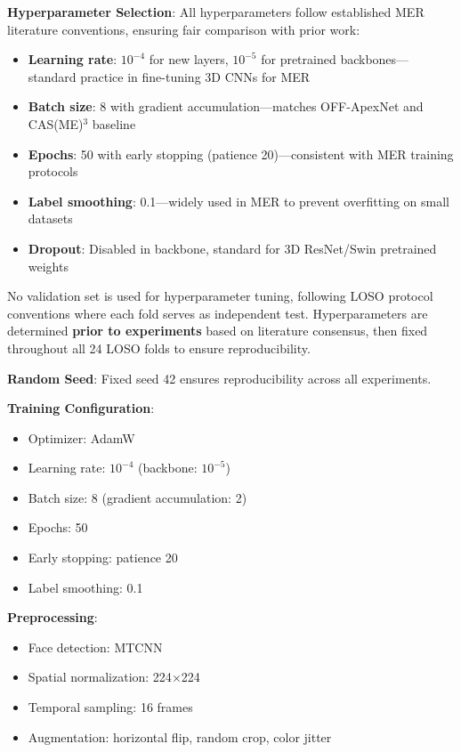 \documentclass[preprint,12pt,authoryear]{elsarticle}
\begin{document}
\textbf{Hyperparameter Selection}: All hyperparameters follow established MER literature conventions, ensuring fair comparison with prior work:

\begin{itemize}
\item \textbf{Learning rate}: $10^{-4}$ for new layers, $10^{-5}$ for pretrained backbones---standard practice in fine-tuning 3D CNNs for MER \cite{wang2022offapexnet,liu2022casme3}
\item \textbf{Batch size}: 8 with gradient accumulation---matches OFF-ApexNet \cite{wang2022offapexnet} and CAS(ME)$^3$ baseline \cite{liu2022casme3}
\item \textbf{Epochs}: 50 with early stopping (patience 20)---consistent with MER training protocols \cite{li2020casme2_protocol}
\item \textbf{Label smoothing}: 0.1---widely used in MER to prevent overfitting on small datasets \cite{wang2022offapexnet}
\item \textbf{Dropout}: Disabled in backbone, standard for 3D ResNet/Swin pretrained weights \cite{hara2018resnet3d}
\end{itemize}

No validation set is used for hyperparameter tuning, following LOSO protocol conventions where each fold serves as independent test. Hyperparameters are determined \textbf{prior to experiments} based on literature consensus, then fixed throughout all 24 LOSO folds to ensure reproducibility.

\textbf{Random Seed}: Fixed seed 42 ensures reproducibility across all experiments.

\textbf{Training Configuration}:
\begin{itemize}
\item Optimizer: AdamW
\item Learning rate: $10^{-4}$ (backbone: $10^{-5}$)
\item Batch size: 8 (gradient accumulation: 2)
\item Epochs: 50
\item Early stopping: patience 20
\item Label smoothing: 0.1
\end{itemize}

\textbf{Preprocessing}:
\begin{itemize}
\item Face detection: MTCNN
\item Spatial normalization: 224$\times$224
\item Temporal sampling: 16 frames
\item Augmentation: horizontal flip, random crop, color jitter
\end{itemize}
\end{document}
